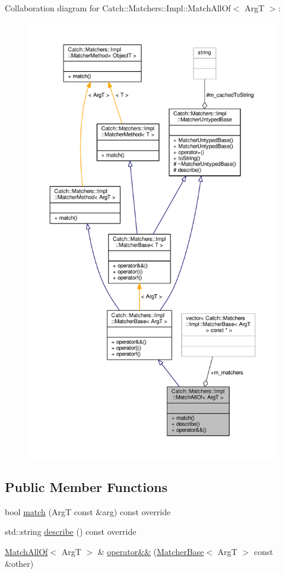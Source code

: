 Collaboration diagram for Catch\-:\-:Matchers\-:\-:Impl\-:\-:Match\-All\-Of$<$ Arg\-T $>$\-:
\nopagebreak
\begin{figure}[H]
\begin{center}
\leavevmode
\includegraphics[height=550pt]{struct_catch_1_1_matchers_1_1_impl_1_1_match_all_of__coll__graph}
\end{center}
\end{figure}
\subsection*{Public Member Functions}
\begin{DoxyCompactItemize}
\item 
bool \hyperlink{struct_catch_1_1_matchers_1_1_impl_1_1_match_all_of_acfb377bda2c58ae62e6df9c3a8a89f8f}{match} (Arg\-T const \&arg) const override
\item 
std\-::string \hyperlink{struct_catch_1_1_matchers_1_1_impl_1_1_match_all_of_acbb9a083e93b546fd33c9235b644c40f}{describe} () const override
\item 
\hyperlink{struct_catch_1_1_matchers_1_1_impl_1_1_match_all_of}{Match\-All\-Of}$<$ Arg\-T $>$ \& \hyperlink{struct_catch_1_1_matchers_1_1_impl_1_1_match_all_of_a3844f9fb55f7a77155576ddc1e3f90d7}{operator\&\&} (\hyperlink{struct_catch_1_1_matchers_1_1_impl_1_1_matcher_base}{Matcher\-Base}$<$ Arg\-T $>$ const \&other)
\end{DoxyCompactItemize}
